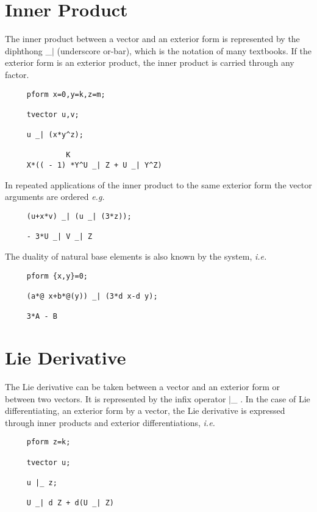 \section{Inner Product}
The inner product between a vector and an exterior form is represented
by the diphthong \_$|$ \label{innerp} (underscore or-bar), which is the
notation of many textbooks.  If the exterior form is an exterior
product, the inner product is carried through any factor.

\example{}

\begin{verbatim}
     pform x=0,y=k,z=m;

     tvector u,v;

     u _| (x*y^z);

              K
     X*(( - 1) *Y^U _| Z + U _| Y^Z)
\end{verbatim}

In repeated applications of the inner product to the same exterior
form the vector arguments are ordered {\em e.g.}

\begin{verbatim}
     (u+x*v) _| (u _| (3*z));

     - 3*U _| V _| Z
\end{verbatim}

The duality of natural base elements is also known by the system, {\em i.e.}

\begin{verbatim}
     pform {x,y}=0;

     (a*@ x+b*@(y)) _| (3*d x-d y);

     3*A - B
\end{verbatim}

\section{Lie Derivative}

The Lie derivative can be taken between a vector and an exterior form
or between two vectors.  It is represented by the infix operator $|$\_
\label{lie}.  In the case of Lie differentiating, an exterior form by
a vector, the Lie derivative is expressed through inner products and
exterior differentiations, {\em i.e.} 

\begin{verbatim}
     pform z=k;

     tvector u;

     u |_ z;

     U _| d Z + d(U _| Z)
\end{verbatim}

